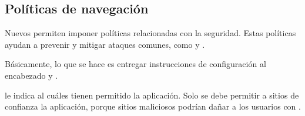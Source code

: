 






\subsection{Políticas de navegación}

Nuevos \browsersINT permiten imponer políticas relacionadas con la seguridad. Estas políticas ayudan a prevenir y mitigar ataques comunes, como \crossSiteScriptingINT y  \clickjackingINT.

Básicamente, lo que se hace es entregar instrucciones de configuración al encabezado \httpNAME \httpHeaderXFMINT y \httpHeaderCSPINT.

\httpHeaderXFMINT le indica al \browserINT cuáles \websitesINT tienen permitido \renderCPT la aplicación. Solo se debe permitir a sitios de confianza \frameCPT la aplicación, porque sitios maliciosos podrían dañar a los usuarios con \clickjackingINT \cite{online_javascript_info_clickjacking_frame_options}.




